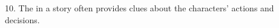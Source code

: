 \documentclass[12pt]{article}
\begin{document}
\vspace{3cm}

10. The \underline{\hspace{4cm}} in a story often provides clues about the characters’ actions and decisions.

\vspace{3cm}














\end{document}
